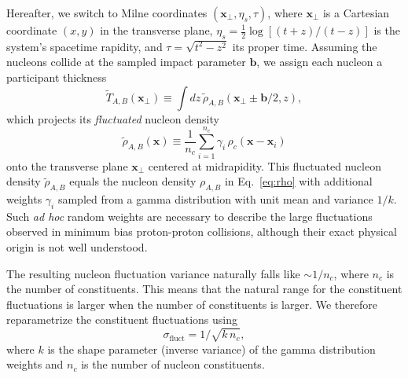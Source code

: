 \documentclass[aps,prc,reprint,amsmath,nofootinbib]{revtex4-1}
\newcommand{\T}{\tilde{T}}
\newcommand{\nc}{n_c}
\newcommand{\bv}{\mathbf b}
\newcommand{\xv}{\mathbf x}
\begin{document}
Hereafter, we switch to Milne coordinates $(\xv_\perp, \eta_s, \tau)$, where $\xv_\perp$ is a Cartesian coordinate $(x, y)$ in the transverse plane, $\eta_s = \tfrac{1}{2} \log[(t+z)/(t-z)]$ is the system's spacetime rapidity, and $\tau = \sqrt{t^2 - z^2}$ its proper time.
Assuming the nucleons collide at the sampled impact parameter $\bv$, we assign each nucleon a participant thickness
\begin{equation}
  \label{eq:fluctuated_thick}
  \T_{A, B}(\xv_\perp) \equiv \int dz\, \tilde{\rho}_{A,B}(\xv_\perp \pm \bv/2, z),
\end{equation}
which projects its \emph{fluctuated} nucleon density
\begin{equation}
  \tilde{\rho}_{A,B}(\xv) \equiv \frac{1}{\nc} \sum\limits_{i=1}^{\nc} \gamma_i\, \rho_c(\xv - \xv_i)
\end{equation}
onto the transverse plane $\xv_\perp$ centered at midrapidity.
This fluctuated nucleon density $\tilde{\rho}_{A,B}$ equals the nucleon density $\rho_{A,B}$ in Eq.~\eqref{eq:rho} with additional weights $\gamma_i$ sampled from a gamma distribution with unit mean and variance $1/k$.
Such \emph{ad hoc} random weights are necessary to describe the large fluctuations observed in minimum bias proton-proton collisions, although their exact physical origin is not well understood.

The resulting nucleon fluctuation variance naturally falls like ${\sim}1/ \nc$, where $\nc$ is the number of constituents.
This means that the natural range for the constituent fluctuations is larger when the number of constituents is larger.
We therefore reparametrize the constituent fluctuations using
\begin{equation}
  \sigma_\mathrm{fluct} = 1 / \sqrt{k\, \nc},
\end{equation}
where $k$ is the shape parameter (inverse variance) of the gamma distribution weights and $\nc$ is the number of nucleon constituents.
\end{document}
